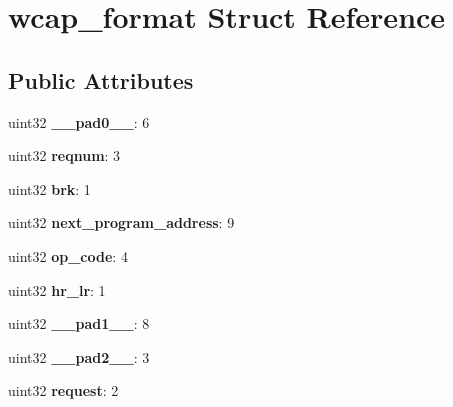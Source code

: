 \hypertarget{structwcap__format}{}\section{wcap\+\_\+format Struct Reference}
\label{structwcap__format}
\subsection*{Public Attributes}
\begin{DoxyCompactItemize}
\item 
\mbox{\label{structwcap__format_a1880af42f5964f28d706ee77b2c8032b}} 
uint32 {\bfseries \+\_\+\+\_\+pad0\+\_\+\+\_\+}\+: 6
\item 
\mbox{\label{structwcap__format_aa89df4662d7b5dcfa09098d547aedd61}} 
uint32 {\bfseries reqnum}\+: 3
\item 
\mbox{\label{structwcap__format_a7fd38f065ee1e2ce8df8940a30a903e3}} 
uint32 {\bfseries brk}\+: 1
\item 
\mbox{\label{structwcap__format_a4f837f04ec916fdefcbf969158844832}} 
uint32 {\bfseries next\+\_\+program\+\_\+address}\+: 9
\item 
\mbox{\label{structwcap__format_ace9c61087c6d7dac44358fa689c888a4}} 
uint32 {\bfseries op\+\_\+code}\+: 4
\item 
\mbox{\label{structwcap__format_a0ff4674cdcf3c4443b64729f948a4a3a}} 
uint32 {\bfseries hr\+\_\+lr}\+: 1
\item 
\mbox{\label{structwcap__format_ac79cadaa47268c80dc608a6527ecf658}} 
uint32 {\bfseries \+\_\+\+\_\+pad1\+\_\+\+\_\+}\+: 8
\item 
\mbox{\label{structwcap__format_a572cbfceb4bb977924ec4bdf6e710a4b}} 
uint32 {\bfseries \+\_\+\+\_\+pad2\+\_\+\+\_\+}\+: 3
\item 
\mbox{\label{structwcap__format_a04d99fea54bd8ca9192ce18eba7abd66}} 
uint32 {\bfseries request}\+: 2
\item 

\end{DoxyCompactItemize}
